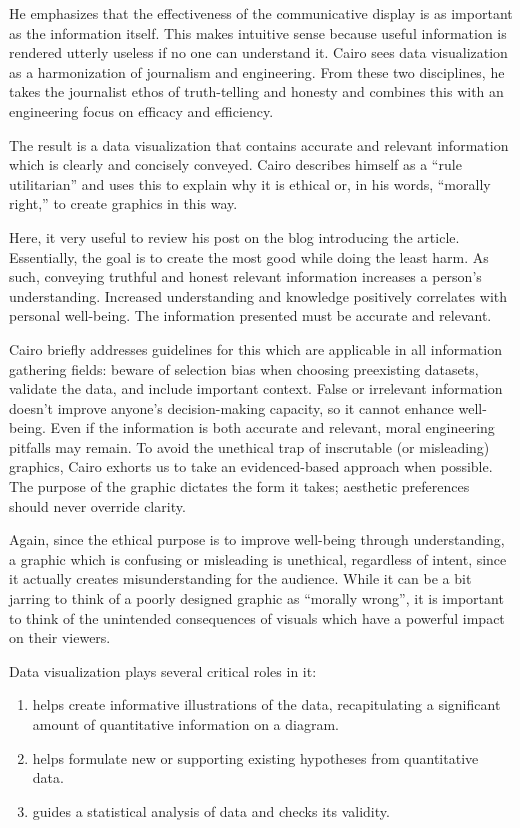 \documentclass[]{book}
\providecommand{\tightlist}{%
  \setlength{\itemsep}{0pt}\setlength{\parskip}{0pt}}
\theoremstyle{definition}
\theoremstyle{definition}
\theoremstyle{definition}
\theoremstyle{remark}
\begin{document}
He emphasizes that the effectiveness of the communicative display is as
important as the information itself. This makes intuitive sense because
useful information is rendered utterly useless if no one can understand
it. Cairo sees data visualization as a harmonization of journalism and
engineering. From these two disciplines, he takes the journalist ethos
of truth-telling and honesty and combines this with an engineering focus
on efficacy and efficiency.

The result is a data visualization that contains accurate and relevant
information which is clearly and concisely conveyed. Cairo describes
himself as a ``rule utilitarian'' and uses this to explain why it is
ethical or, in his words, ``morally right,'' to create graphics in this
way.

Here, it very useful to review his post on the blog introducing the
article. Essentially, the goal is to create the most good while doing
the least harm. As such, conveying truthful and honest relevant
information increases a person's understanding. Increased understanding
and knowledge positively correlates with personal well-being. The
information presented must be accurate and relevant.

Cairo briefly addresses guidelines for this which are applicable in all
information gathering fields: beware of selection bias when choosing
preexisting datasets, validate the data, and include important context.
False or irrelevant information doesn't improve anyone's decision-making
capacity, so it cannot enhance well-being. Even if the information is
both accurate and relevant, moral engineering pitfalls may remain. To
avoid the unethical trap of inscrutable (or misleading) graphics, Cairo
exhorts us to take an evidenced-based approach when possible. The
purpose of the graphic dictates the form it takes; aesthetic preferences
should never override clarity.

Again, since the ethical purpose is to improve well-being through
understanding, a graphic which is confusing or misleading is unethical,
regardless of intent, since it actually creates misunderstanding for the
audience. While it can be a bit jarring to think of a poorly designed
graphic as ``morally wrong'', it is important to think of the unintended
consequences of visuals which have a powerful impact on their viewers.

Data visualization plays several critical roles in it:

\begin{enumerate}
\def\labelenumi{\arabic{enumi})}
\tightlist
\item
  helps create informative illustrations of the data, recapitulating a
  significant amount of quantitative information on a diagram.
\item
  helps formulate new or supporting existing hypotheses from
  quantitative data.
\item
  guides a statistical analysis of data and checks its validity.
\end{enumerate}
\end{document}
